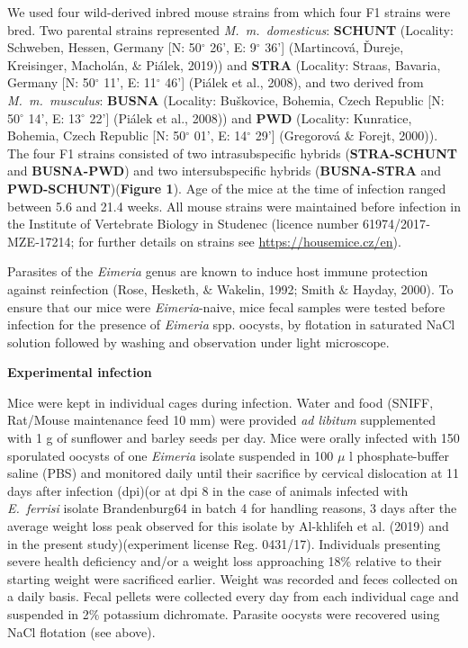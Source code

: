 \documentclass[12pt]{article}
\renewcommand{\_}{\kern-1.5pt\textunderscore\kern-1.5pt}
\begin{document}
We used four wild-derived inbred mouse strains \textcolor[HTML]{CE181E}{from which four F1 strains were bred. Two parental strains represented \textit{M. m. domesticus}: \textbf{SCHUNT} (Locality: Schweben, Hessen, Germany [N: 50$ ^{\circ} $  26’, E: 9$ ^{\circ} $  36’] (Martincov}á, Ďureje, Kreisinger, Macholán, $\&$  Piálek, 2019)) and \textbf{STRA} (Locality: Straas, Bavaria, Germany [N: 50$ ^{\circ} $  11’, E: 11$ ^{\circ} $  46’] (Piálek et al., 2008), and two derived from \textit{M. m. musculus}: \textbf{BUSNA} (Locality: Buškovice, Bohemia, Czech Republic [N: 50$ ^{\circ} $  14’, E: 13$ ^{\circ} $  22’] (Piálek et al., 2008)) and \textbf{PWD} (Locality: Kunratice, Bohemia, Czech Republic [N: 50$ ^{\circ} $  01’, E: 14$ ^{\circ} $  29’] (Gregorová $\&$  Forejt, 2000)). \textcolor[HTML]{CE181E}{The four F1 strains consisted of two intrasubspecific hybrids (\textbf{STRA-SCHUNT }and \textbf{BUSNA-PWD}) and two intersubspecific hybrids (\textbf{BUSNA-STRA} and  \textbf{PWD-SCHUNT})(\textbf{Figure 1}). Age of the mice at the time of infection ranged between 5.6 and 21.4 weeks. All mouse strains were maintained before infection in the Institute of Vertebrate Biology in Studenec (licence number 6197}4/2017‐MZE‐17214; for further details on strains see \href{https://housemice.cz/en}{\textcolor[HTML]{00000A}{https://housemice.cz/}\href{https://housemice.cz/en}{en}}).\par

Parasites of the \textit{Eimeria }genus are known to induce host immune protection against reinfection (Rose, Hesketh, $\&$  Wakelin, 1992; Smith $\&$  Hayday, 2000). To ensure that our mice were \textit{Eimeria}-naive, mice fecal samples were tested before infection for the presence of \textit{Eimeria }spp. oocysts, by flotation in saturated NaCl solution followed by washing and observation under light microscope. \par

{\fontsize{14pt}{16.8pt}\selectfont \textbf{Experimental infection}\par}\par

Mice were kept in individual cages during infection. Water and food (SNIFF, Rat/Mouse maintenance feed 10 mm) were provided \textit{ad libitum} supplemented with 1 g of sunflower and barley seeds per day. Mice were orally infected with 150 sporulated oocysts of one \textit{Eimeria }isolate suspended in 100 $ \mu $ l phosphate-buffer saline (PBS) and monitored daily until their sacrifice by cervical dislocation at 11 days after infection (dpi)\textcolor[HTML]{FF0000}{(or at dpi 8 in the case of animals infected with \textit{E. ferrisi} isolate Brandenburg64 in batch 4 for handling reasons, 3 days after the average weight loss peak observed for this isolate by Al-khlifeh et al. (2019) and in the present study)(experiment license Reg. 0431/17). Individuals presenting severe health deficiency and/or a weight loss approaching 18$\%$  relative to their starting weight were sacrificed earlier. Weight was recorded and feces collected on a daily basis. Fecal pellets were collected every day from each individual cage and suspended in 2$\%$  potassium dichromate. Parasite oocysts were recovered using NaCl flotation (see above). }\par
\end{document}
